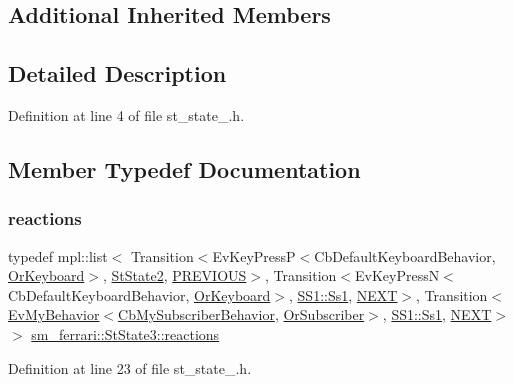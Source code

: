 \subsection*{Additional Inherited Members}


\subsection{Detailed Description}


Definition at line 4 of file st\+\_\+state\+\_.\+h.



\subsection{Member Typedef Documentation}
\mbox{\label{structsm__ferrari_1_1StState3_a6b4cf02dd8c8393ff525bd4c014301a7}} 
\subsubsection{\texorpdfstring{reactions}{reactions}}
{\footnotesize\ttfamily typedef mpl\+::list$<$ Transition$<$Ev\+Key\+PressP$<$Cb\+Default\+Keyboard\+Behavior, \hyperlink{classsm__ferrari_1_1OrKeyboard}{Or\+Keyboard}$>$, \hyperlink{structsm__ferrari_1_1StState2}{St\+State2}, \hyperlink{structsm__ferrari_1_1StState3_1_1PREVIOUS}{P\+R\+E\+V\+I\+O\+US}$>$, Transition$<$Ev\+Key\+PressN$<$Cb\+Default\+Keyboard\+Behavior, \hyperlink{classsm__ferrari_1_1OrKeyboard}{Or\+Keyboard}$>$, \hyperlink{structsm__ferrari_1_1SS1_1_1Ss1}{S\+S1\+::\+Ss1}, \hyperlink{structsm__ferrari_1_1StState3_1_1NEXT}{N\+E\+XT}$>$, Transition$<$\hyperlink{structsm__ferrari_1_1cl__subscriber_1_1EvMyBehavior}{Ev\+My\+Behavior}$<$\hyperlink{classsm__ferrari_1_1cl__subscriber_1_1CbMySubscriberBehavior}{Cb\+My\+Subscriber\+Behavior}, \hyperlink{classsm__ferrari_1_1OrSubscriber}{Or\+Subscriber}$>$, \hyperlink{structsm__ferrari_1_1SS1_1_1Ss1}{S\+S1\+::\+Ss1}, \hyperlink{structsm__ferrari_1_1StState3_1_1NEXT}{N\+E\+XT}$>$ $>$ \hyperlink{structsm__ferrari_1_1StState3_a6b4cf02dd8c8393ff525bd4c014301a7}{sm\+\_\+ferrari\+::\+St\+State3\+::reactions}}



Definition at line 23 of file st\+\_\+state\+\_.\+h.



